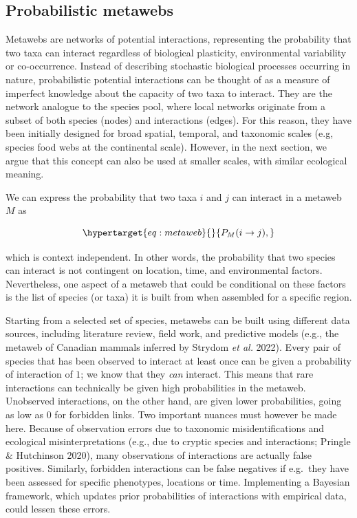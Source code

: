 \documentclass[10pt,oneside]{article}
\begin{document}
\hypertarget{probabilistic-metawebs}{%
\subsection{Probabilistic metawebs}\label{probabilistic-metawebs}}

Metawebs are networks of potential interactions, representing the
probability that two taxa can interact regardless of biological
plasticity, environmental variability or co-occurrence. Instead of
describing stochastic biological processes occurring in nature,
probabilistic potential interactions can be thought of as a measure of
imperfect knowledge about the capacity of two taxa to interact. They are
the network analogue to the species pool, where local networks originate
from a subset of both species (nodes) and interactions (edges). For this
reason, they have been initially designed for broad spatial, temporal,
and taxonomic scales (e.g, species food webs at the continental scale).
However, in the next section, we argue that this concept can also be
used at smaller scales, with similar ecological meaning.

We can express the probability that two taxa \(i\) and \(j\) can
interact in a metaweb \(M\) as

\begin{equation}\protect\hypertarget{eq:metaweb}{}{P_{M}(i \rightarrow j),}\label{eq:metaweb}\end{equation}

which is context independent. In other words, the probability that two
species can interact is not contingent on location, time, and
environmental factors. Nevertheless, one aspect of a metaweb that could
be conditional on these factors is the list of species (or taxa) it is
built from when assembled for a specific region.

Starting from a selected set of species, metawebs can be built using
different data sources, including literature review, field work, and
predictive models (e.g., the metaweb of Canadian mammals inferred by
Strydom \emph{et al.} 2022). Every pair of species that has been
observed to interact at least once can be given a probability of
interaction of \(1\); we know that they \emph{can} interact. This means
that rare interactions can technically be given high probabilities in
the metaweb. Unobserved interactions, on the other hand, are given lower
probabilities, going as low as \(0\) for forbidden links. Two important
nuances must however be made here. Because of observation errors due to
taxonomic misidentifications and ecological misinterpretations (e.g.,
due to cryptic species and interactions; Pringle \& Hutchinson 2020),
many observations of interactions are actually false positives.
Similarly, forbidden interactions can be false negatives if e.g.~they
have been assessed for specific phenotypes, locations or time.
Implementing a Bayesian framework, which updates prior probabilities of
interactions with empirical data, could lessen these errors.
\end{document}
